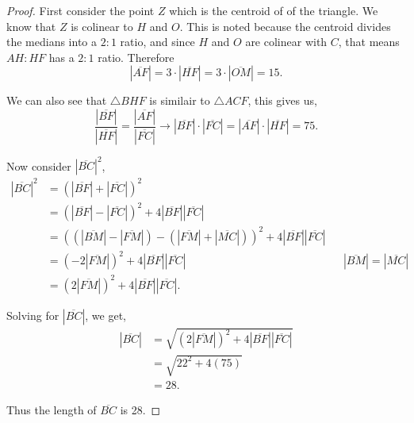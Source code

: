 \documentclass[11pt]{article}
\newcommand{\abs}[1]{\left\lvert#1\right\rvert} %
\begin{document}
\begin{proof}
    \newcommand{\leng}[1]{\abs{\overline{#1}}}
    First consider the point $Z$ which is the centroid of of the triangle. We know that $Z$ is colinear to $H$ and $O$. This is noted because the centroid divides the medians into a $2:1$ ratio, and since $H$ and $O$ are colinear with $C$, that means $AH:HF$ has a $2:1$ ratio. Therefore \[\abs{\overline{AF}} = 3 \cdot \leng{HF} = 3 \cdot \leng{OM} = 15.\]

    We can also see that $\triangle BHF$ is similair to $\triangle ACF$, this gives us, \[\frac{\leng{BF}}{\leng{HF}} = \frac{\leng{AF}}{\leng{FC}} \rightarrow \leng{BF} \cdot \leng{FC} = \leng{AF} \cdot \leng{HF}  = 75. \]

    Now consider $\leng{BC}^{2}$, 
    \begin{align*}
        \leng{BC}^{2} &= (\leng{BF} + \leng{FC})^{2} \\
        &= (\leng{BF} - \leng{FC})^{2} + 4\leng{BF}\leng{FC} \\
        &= ((\leng{BM} - \leng{FM}) - (\leng{FM} + \leng{MC}))^{2} + 4\leng{BF}\leng{FC} \\
        &= (-2\leng{FM})^{2} + 4\leng{BF}\leng{FC} && \leng{BM} = \leng{MC} \\
        &= (2\leng{FM})^{2}+ 4\leng{BF}\leng{FC} .
    \end{align*}

    Solving for $\leng{BC}$, we get,
    \begin{align*}
        \leng{BC} &= \sqrt{(2\leng{FM})^{2}+ 4\leng{BF}\leng{FC}} \\
        &= \sqrt{22^{2} + 4(75)} \\
        &= 28.
    \end{align*}

    Thus the length of $\overline{BC}$ is 28.

\end{proof}
\end{document}

